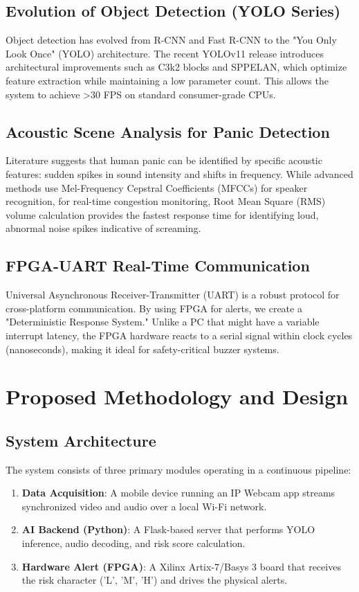 \documentclass[12pt,oneside,a4paper]{book}
\begin{document}
\section{Evolution of Object Detection (YOLO Series)}
Object detection has evolved from R-CNN and Fast R-CNN to the "You Only Look Once" (YOLO) architecture. The recent YOLOv11 release introduces architectural improvements such as C3k2 blocks and SPPELAN, which optimize feature extraction while maintaining a low parameter count. This allows the system to achieve >30 FPS on standard consumer-grade CPUs.

\section{Acoustic Scene Analysis for Panic Detection}
Literature suggests that human panic can be identified by specific acoustic features: sudden spikes in sound intensity and shifts in frequency. While advanced methods use Mel-Frequency Cepstral Coefficients (MFCCs) for speaker recognition, for real-time congestion monitoring, Root Mean Square (RMS) volume calculation provides the fastest response time for identifying loud, abnormal noise spikes indicative of screaming.

\section{FPGA-UART Real-Time Communication}
Universal Asynchronous Receiver-Transmitter (UART) is a robust protocol for cross-platform communication. By using FPGA for alerts, we create a "Deterministic Response System." Unlike a PC that might have a variable interrupt latency, the FPGA hardware reacts to a serial signal within clock cycles (nanoseconds), making it ideal for safety-critical buzzer systems.

\chapter{Proposed Methodology and Design}

\section{System Architecture}
The system consists of three primary modules operating in a continuous pipeline:
\begin{enumerate}
    \item \textbf{Data Acquisition}: A mobile device running an IP Webcam app streams synchronized video and audio over a local Wi-Fi network.
    \item \textbf{AI Backend (Python)}: A Flask-based server that performs YOLO inference, audio decoding, and risk score calculation.
    \item \textbf{Hardware Alert (FPGA)}: A Xilinx Artix-7/Basys 3 board that receives the risk character ('L', 'M', 'H') and drives the physical alerts.
\end{enumerate}
\end{document}
